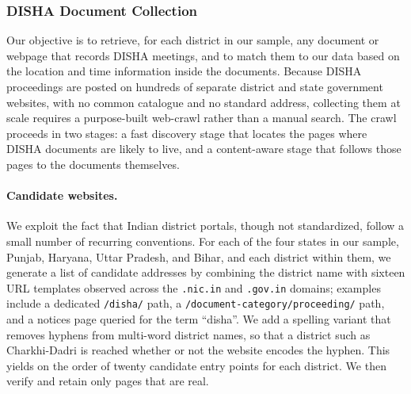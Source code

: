 \documentclass[12pt]{article}
\begin{document}
\subsubsection{DISHA Document Collection}\label{ssec:disha_app}

Our objective is to retrieve, for each district in our sample, any document or
webpage that records DISHA meetings, and to match them to our data based on the
location and time information inside the documents. Because DISHA proceedings
are posted on hundreds of separate district and state government websites, with
no common catalogue and no standard address, collecting them at scale requires a
purpose-built web-crawl rather than a manual search. The crawl proceeds in two
stages: a fast discovery stage that locates the pages where DISHA documents are
likely to live, and a content-aware stage that follows those pages to the
documents themselves.

\paragraph{Candidate websites.} We exploit the fact that Indian district
portals, though not standardized, follow a small number of recurring
conventions. For each of the four states in our sample, Punjab, Haryana, Uttar
Pradesh, and Bihar, and each district within them, we generate a list of
candidate addresses by combining the district name with sixteen URL templates
observed across the \texttt{.nic.in} and \texttt{.gov.in} domains; examples
include a dedicated \texttt{/disha/} path, a
\texttt{/document-category/proceeding/} path, and a notices page queried for the
term ``disha''. We add a spelling variant that removes hyphens from multi-word
district names, so that a district such as Charkhi-Dadri is reached whether or
not the website encodes the hyphen. This yields on the order of twenty candidate
entry points for each district. We then verify and retain only pages that are real. 

\end{document}
